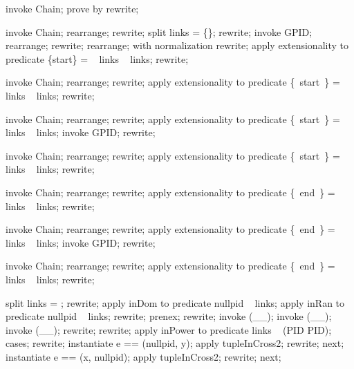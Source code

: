 \begin{forget}[lEmptySetEmptyLinks]
invoke Chain;
prove by rewrite;
\end{forget}

\begin{forget}[lNonEmptySetNonNullStart]
invoke Chain;
rearrange;
rewrite;
split links = \{\};
rewrite;
invoke GPID;
rearrange;
rewrite;
rearrange;
with normalization rewrite;
apply extensionality to predicate \{start\} = \dom~ links \setminus  \ran~  links;
rewrite;
\end{forget}

\begin{forget}[lNonEmptyLinksStartLinked]
invoke Chain;
rearrange;
rewrite;
apply extensionality to predicate \{~start~\} = \dom~  links \setminus  \ran~  links;
rewrite;
\end{forget}

\begin{forget}[lNonEmptyLinksStartNotNull]
invoke Chain;
rearrange;
rewrite;
apply extensionality to predicate \{~start~\} = \dom~  links \setminus  \ran~  links;
invoke GPID;
rewrite;
\end{forget}

\begin{forget}[lNonEmptyLinksStartNotInRan]
invoke Chain;
rearrange;
rewrite;
apply extensionality to predicate \{~start~\} = \dom~  links \setminus  \ran~  links;
rewrite;
\end{forget}

\begin{forget}[lNonEmptyLinksEndNotInDom]
invoke Chain;
rearrange;
rewrite;
apply extensionality to predicate \{~end~\} = \ran~  links \setminus  \dom~  links;
rewrite;
\end{forget}

\begin{forget}[lNonEmptyLinksEndNotNull]
invoke Chain;
rearrange;
rewrite;
apply extensionality to predicate \{~end~\} = \ran~  links \setminus  \dom~  links;
invoke GPID;
rewrite;
\end{forget}

\begin{forget}[lNonEmptyLinksEndLinked]
invoke Chain;
rearrange;
rewrite;
apply extensionality to predicate \{~end~\} = \ran~  links \setminus  \dom~  links;
rewrite;
\end{forget}

\begin{forget}[lChainLinksHasNoNullPid]
split links = \emptyset;
rewrite;
apply inDom to predicate nullpid \in  \dom~  links;
apply inRan to predicate nullpid \in  \ran~  links;
rewrite;
prenex;
rewrite;
invoke (\_\pinj \_);
invoke (\_\pfun \_);
invoke (\_\rel \_);
rewrite;
rewrite;
apply inPower to predicate links \in  \power~  (PID \cross  PID);
cases;
rewrite;
instantiate e == (nullpid, y);
apply tupleInCross2;
rewrite;
next;
instantiate e == (x, nullpid);
apply tupleInCross2;
rewrite;
next;
\end{forget}


